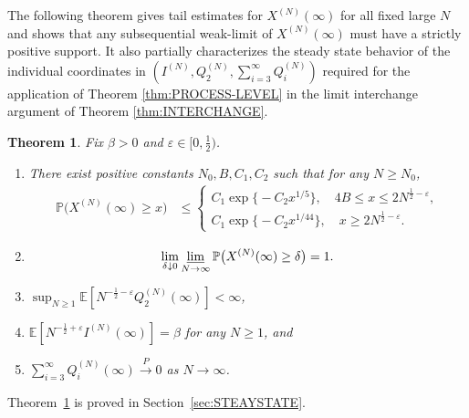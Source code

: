 \documentclass[11pt, reqno]{article}
\newtheorem{theorem}{Theorem}
\numberwithin{equation}{section}
\numberwithin{theorem}{section}
\newcommand\blue[1]{#1}
\newcommand{\PR}{\ensuremath{\mathbb{P}}}
\newcommand{\PP}{\mathbb{P}}  				%
\newcommand{\E}{\mathbb{E}}                 %
\begin{document}
The following theorem gives tail estimates for $X^{(N)}(\infty)$ for all fixed large $N$ \blue{and shows that any subsequential weak-limit of $X^{(N)}(\infty)$ must have a strictly positive support}. 
It also partially characterizes the steady state behavior of the individual coordinates in $(I^{(N)}, Q^{(N)}_2,\sum_{i=3}^{\infty}Q^{(N)}_i)$ required for the application of Theorem \ref{thm:PROCESS-LEVEL} in the limit interchange argument of Theorem \ref{thm:INTERCHANGE}.
\begin{theorem}\label{thm:TIGHTNESS-XN}
Fix $\beta>0$ and $\varepsilon \in [0, \frac{1}{2})$. 
\begin{enumerate}[\normalfont (i)]
\item There exist positive constants $N_0,B, C_1,C_2$ such that for any $N\geq N_0$,
\begin{equation}
\label{eq:thm-2.3-tail}
\begin{split}
    \PR\big(X^{(N)}(\infty)\geq x\big)&
    \leq \begin{cases}C_1\exp\big\{-C_2x^{1/5}\big\},\quad 4B\leq x\leq 2N^{\frac{1}{2}-\varepsilon},\\
    C_1\exp \big\{-C_2x^{1/44}\big\},\quad x\geq 2N^{\frac{1}{2}-\varepsilon}.
    \end{cases}
\end{split}
\end{equation}
\item 
\blue{\begin{equation}\label{eq:steady-state-lb}
\lim_{\delta\downarrow0}\varliminf_{N\rightarrow\infty}\PP\big(X^{(N)}(\infty)\ge \delta\big)= 1.
\end{equation}}
\item $\sup_{N \ge 1} \E\left[N^{-\frac{1}{2} - \varepsilon}Q^{(N)}_2(\infty)\right] < \infty$, 
\item $\E\left[N^{-\frac{1}{2} + \varepsilon}I^{(N)}(\infty)\right] = \beta$ for any $N \ge 1$, and 
\item $\sum_{i=3}^{\infty}Q^{(N)}_i(\infty) \xrightarrow{P} 0$ as $N \rightarrow \infty$.
\end{enumerate}
\end{theorem}
Theorem~\ref{thm:TIGHTNESS-XN} is proved in Section~\ref{sec:STEAYSTATE}.
\end{document}

